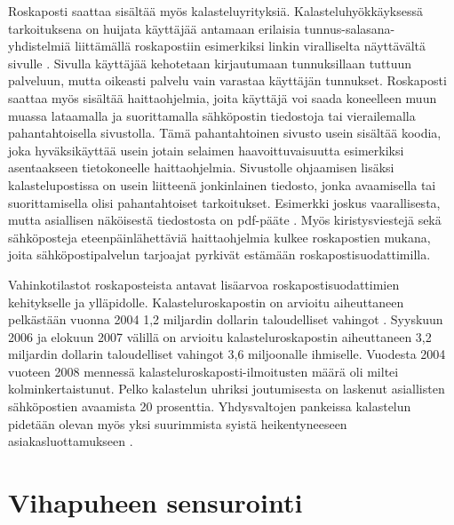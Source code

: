 Roskaposti saattaa sisältää myös kalasteluyrityksiä. Kalasteluhyökkäyksessä tarkoituksena on huijata käyttäjää antamaan erilaisia tunnus-salasana-yhdistelmiä liittämällä roskapostiin esimerkiksi linkin viralliselta näyttävältä sivulle \citep{phishing}. Sivulla käyttäjää kehotetaan kirjautumaan tunnuksillaan tuttuun palveluun, mutta oikeasti palvelu vain varastaa käyttäjän tunnukset. Roskaposti saattaa myös sisältää haittaohjelmia, joita käyttäjä voi saada koneelleen muun muassa lataamalla ja suorittamalla sähköpostin tiedostoja tai vierailemalla pahantahtoisella sivustolla. Tämä pahantahtoinen sivusto usein sisältää koodia, joka hyväksikäyttää usein jotain selaimen haavoittuvaisuutta esimerkiksi asentaakseen tietokoneelle haittaohjelmia. Sivustolle ohjaamisen lisäksi kalastelupostissa on usein liitteenä jonkinlainen tiedosto, jonka avaamisella tai suorittamisella olisi pahantahtoiset tarkoitukset. Esimerkki joskus vaarallisesta, mutta asiallisen näköisestä tiedostosta on pdf-pääte \citep{hoxhunt}. Myös kiristysviestejä sekä sähköposteja eteenpäinlähettäviä haittaohjelmia kulkee roskapostien mukana, joita sähköpostipalvelun tarjoajat pyrkivät estämään roskapostisuodattimilla.

Vahinkotilastot roskaposteista antavat lisäarvoa roskapostisuodattimien kehitykselle ja ylläpidolle. Kalasteluroskapostin on arvioitu aiheuttaneen pelkästään vuonna 2004 1,2 miljardin dollarin taloudelliset vahingot \citep{indirect}. Syyskuun 2006 ja elokuun 2007 välillä on arvioitu kalasteluroskapostin aiheuttaneen 3,2 miljardin dollarin taloudelliset vahingot 3,6 miljoonalle ihmiselle. Vuodesta 2004 vuoteen 2008 mennessä kalasteluroskaposti-ilmoitusten määrä oli miltei kolminkertaistunut. Pelko kalastelun uhriksi joutumisesta on laskenut asiallisten sähköpostien avaamista 20 prosenttia. Yhdysvaltojen pankeissa kalastelun pidetään olevan myös yksi suurimmista syistä heikentyneeseen asiakasluottamukseen \citep{stats-phishing}.

\section{Vihapuheen sensurointi}

